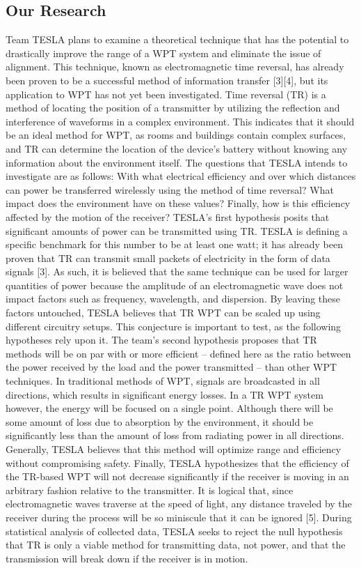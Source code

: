\subsection{Our Research}
Team TESLA plans to examine a theoretical technique that has the potential to drastically improve the range of a WPT system and eliminate the issue of alignment. This technique, known as electromagnetic time reversal, has already been proven to be a successful method of information transfer [3][4], but its application to WPT has not yet been investigated. Time reversal (TR) is a method of locating the position of a transmitter by utilizing the reflection and interference of waveforms in a complex environment. This indicates that it should be an ideal method for WPT, as rooms and buildings contain complex surfaces, and TR can determine the location of the device’s battery without knowing any information about the environment itself.
The questions that TESLA intends to investigate are as follows: With what electrical efficiency and over which distances can power be transferred wirelessly using the method of time reversal? What impact does the environment have on these values? Finally, how is this efficiency affected by the motion of the receiver?
TESLA’s first hypothesis posits that significant amounts of power can be transmitted using TR. TESLA is defining a specific benchmark for this number to be at least one watt; it has already been proven that TR can transmit small packets of electricity in the form of data signals [3]. As such, it is believed that the same technique can be used for larger quantities of power because the amplitude of an electromagnetic wave does not impact factors such as frequency, wavelength, and dispersion. By leaving these factors untouched, TESLA believes that TR WPT can be scaled up using different circuitry setups. This conjecture is important to test, as the following hypotheses rely upon it.
The team’s second hypothesis proposes that TR methods will be on par with or more efficient – defined here as the ratio between the power received by the load and the power transmitted – than other WPT techniques. In traditional methods of WPT, signals are broadcasted in all directions, which results in significant energy losses. In a TR WPT system however, the energy will be focused on a single point. Although there will be some amount of loss due to absorption by the environment, it should be significantly less than the amount of loss from radiating power in all directions. Generally, TESLA believes that this method will optimize range and efficiency without compromising safety.
Finally, TESLA hypothesizes that the efficiency of the TR-based WPT will not decrease significantly if the receiver is moving in an arbitrary fashion relative to the transmitter. It is logical that, since electromagnetic waves traverse at the speed of light, any distance traveled by the receiver during the process will be so miniscule that it can be ignored [5]. During statistical analysis of collected data, TESLA seeks to reject the null hypothesis that TR is only a viable method for transmitting data, not power, and that the transmission will break down if the receiver is in motion.
